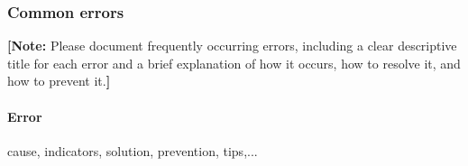 \subsubsection{Common errors}
\textbf{[Note:} Please document frequently occurring errors, including a clear descriptive title for each error and a brief explanation of how it occurs, how to resolve it, and how to prevent it.\textbf{]}

\paragraph{Error}
cause, indicators, solution, prevention, tips,...


